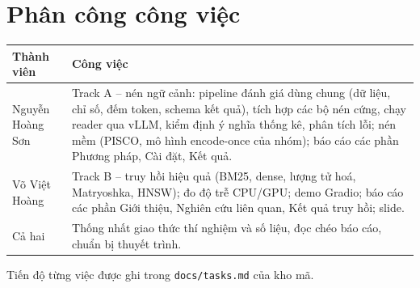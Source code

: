 \section*{Phân công công việc}
\label{sec:contrib}

\begin{center}
\small
\begin{tabularx}{\linewidth}{l X}
\toprule
Thành viên & Công việc \\
\midrule
Nguyễn Hoàng Sơn & Track A -- nén ngữ cảnh: pipeline đánh giá dùng chung (dữ liệu, chỉ số, đếm token,
schema kết quả), tích hợp các bộ nén cứng, chạy reader qua vLLM, kiểm định ý nghĩa thống kê, phân
tích lỗi; nén mềm (PISCO, mô hình encode-once của nhóm); báo cáo các phần Phương pháp, Cài đặt, Kết
quả. \\
Võ Việt Hoàng & Track B -- truy hồi hiệu quả (BM25, dense, lượng tử hoá, Matryoshka, HNSW); đo độ
trễ CPU/GPU; demo Gradio; báo cáo các phần Giới thiệu, Nghiên cứu liên quan, Kết quả truy hồi;
slide. \\
Cả hai & Thống nhất giao thức thí nghiệm và số liệu, đọc chéo báo cáo, chuẩn bị thuyết trình. \\
\bottomrule
\end{tabularx}
\end{center}

Tiến độ từng việc được ghi trong \texttt{docs/tasks.md} của kho mã.
